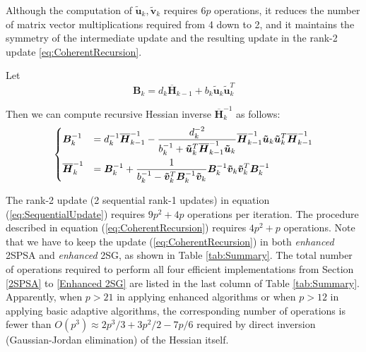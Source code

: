 \documentclass[conference]{IEEEtran}
\newcommand{\oH}{\bm{\overline{H}}}
\begin{document}
Although the computation of $\bm{\tilde{u}}_k, \bm{\tilde{v}}_k$ requires
$6p$ operations, it reduces the number of matrix vector multiplications
required from 4 down to 2, and it maintains the symmetry of the intermediate update and the resulting update in the rank-2 update \ref{eq:CoherentRecursion}.


Let
\begin{equation*}
\bm{B}_k=d_k\oH_{k-1}+b_k\bm{\tilde{u}}_k \bm{\tilde{u}}_k^{T}
\end{equation*}

Then we can compute recursive Hessian inverse $\oH_k^{-1}$ as follows:
\begin{equation} \label{eq:SequentialUpdate}
\begin{dcases}
\bm{B}_k^{-1}
&= d_k^{-1}\oH_{k-1}^{-1} -
   \frac{d_k^{-2}}{b_k^{-1}+\bm{\tilde{u}}_k^{T}\oH_{k-1}^{-1}\bm{\tilde{u}}_k}
   \oH_{k-1}^{-1}\bm{\tilde{u}}_k \bm{\tilde{u}}_k^{T}\oH_{k-1}^{-1}\\
\oH_k^{-1}
&=\bm{B}_k^{-1} + \frac{1}{b_k^{-1}-\bm{\tilde{v}}_k^{T}\bm{B}_k^{-1}\bm{\tilde{v}}_k} \bm{B}_k^{-1}\bm{\tilde{v}}_k \bm{\tilde{v}}_k^{T}\bm{B}_{k}^{-1}
\end{dcases}
\end{equation}

The rank-2 update (2 sequential rank-1 updates) in equation (\ref{eq:SequentialUpdate}) requires $9p^2 + 4p$ operations per iteration. The procedure described in equation (\ref{eq:CoherentRecursion}) requires $4p^2 + p$ operations. Note that we have to keep the update (\ref{eq:CoherentRecursion}) in both \textit{enhanced} 2SPSA and \textit{enhanced} 2SG, as shown in Table \ref{tab:Summary}. The total number of operations required to perform all four efficient implementations from Section \ref{2SPSA} to \ref{Enhanced 2SG} are listed in the last column of Table \ref{tab:Summary}. Apparently, when $p>21$ in applying enhanced algorithms or when $p>12$ in applying basic adaptive algorithms, the corresponding number of operations is fewer than $O(p^3)\approx2p^3/3+3p^2/2-7p/6$ required by direct inversion (Gaussian-Jordan elimination) of the Hessian itself.


%
%
\end{document}
